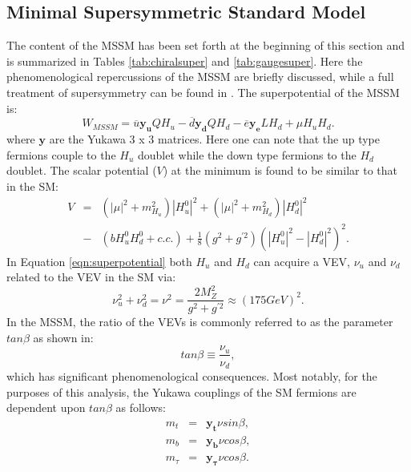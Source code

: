 \subsection{Minimal Supersymmetric Standard Model}
\label{sec:mssm}
The content of the MSSM has been set forth at the beginning of this section and is summarized in Tables \ref{tab:chiralsuper} and \ref{tab:gaugesuper}. 
Here the phenomenological repercussions of the MSSM are briefly discussed, while a full treatment of supersymmetry can be found in \cite{SUSY}.
The superpotential of the MSSM is:
\begin{equation}
W_{MSSM} = \overline{u}\mathbf{y_{u}}QH_{u} - \overline{d}\mathbf{y_{d}}QH_{d} - \overline{e}\mathbf{y_{e}}LH_{d} + \mu H_{u}H_{d}.
\end{equation}
where $\mathbf{y}$ are the Yukawa 3 x 3 matrices.
Here one can note that the up type fermions couple to the $H_{u}$ doublet while the down type fermions to the $H_{d}$ doublet.
The scalar potential ($V$) at the minimum is found to be similar to that in the SM:
\begin{equation}
\begin{array}{rcl}
\label{eqn:superpotential}
V & = & (|\mu|^{2} + m_{H_{u}}^{2})|H_{u}^{0}|^{2} + (|\mu|^{2} + m_{H_{d}}^{2})|H_{d}^{0}|^{2} \\
  & - & (bH_{u}^{0}H_{d}^{0} + c.c.) + \frac{1}{8}(g^{2} + g^{\prime 2})(|H_{u}^{0}|^{2} - |H_{d}^{0}|^2)^{2}.
\end{array}
\end{equation}
In Equation \ref{eqn:superpotential} both $H_{u}$ and $H_{d}$ can acquire a VEV, $\nu_{u}$ and $\nu_{d}$ related to the VEV in the SM via:
\begin{equation}
\nu_{u}^{2} + \nu_{d}^{2} = \nu^{2} = \frac{2M_{Z}^{2}}{g^{2} + g^{\prime 2}} \approx (175 GeV)^{2}.
\end{equation} 
In the MSSM, the ratio of the VEVs is commonly referred to as the parameter $tan\beta$ as shown in:
\begin{equation}
tan\beta \equiv \frac{\nu_{u}}{\nu_{d}},
\end{equation}
which has significant phenomenological consequences.
Most notably, for the purposes of this analysis, the Yukawa couplings of the SM fermions are dependent upon $tan\beta$ as follows:
\begin{equation}
\begin{array}{rcl}
\label{eqn:mssmcouplings}
m_{t} & = & \mathbf{y_{t}}\nu sin\beta, \\
m_{b} & = & \mathbf{y_{b}}\nu cos\beta, \\
m_{\tau} & = & \mathbf{y_{\tau}}\nu cos\beta.
\end{array}
\end{equation}
